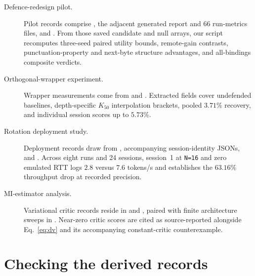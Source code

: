 {\begin{description}
\item[\hypertarget{artifact-P4}{Defence-redesign pilot.}]
Pilot records comprise
,
the adjacent generated report and 66 run-metrics files, and
. From those saved
candidate and null arrays, our script recomputes three-seed paired utility
bounds, remote-gain contrasts, punctuation-property and next-byte structure
advantages, and all-bindings composite verdicts.

\item[\hypertarget{artifact-E8}{Orthogonal-wrapper experiment.}]
Wrapper measurements come from
and . Extracted fields
cover undefended baselines, depth-specific $K_{50}$ interpolation brackets,
pooled $3.71\%$ recovery, and individual session scores up to $5.73\%$.

\item[\hypertarget{artifact-ER}{Rotation deployment study.}]
Deployment records draw from
,
accompanying session-identity JSONs, and
. Across eight
runs and 24 sessions, session~1 at \texttt{N=16} and zero emulated RTT logs
$2.8$ versus $7.6$ tokens/s and establishes the $63.16\%$ throughput drop
at recorded precision.

\item[\hypertarget{artifact-MI}{MI-estimator analysis.}]
Variational critic records reside in
 and
, paired with finite
architecture sweeps in
. Near-zero
critic scores are cited as source-reported alongside Eq.~\eqref{eq:dv} and
its accompanying constant-critic counterexample.
\end{description}
}

\section{Checking the derived records}
\label{app:checks}

